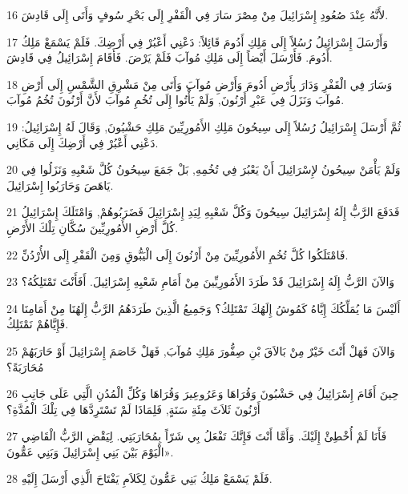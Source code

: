 \par 16 لأَنَّهُ عِنْدَ صُعُودِ إِسْرَائِيلَ مِنْ مِصْرَ سَارَ فِي الْقَفْرِ إِلَى بَحْرِ سُوفٍ وَأَتَى إِلَى قَادِشَ.
\par 17 وَأَرْسَلَ إِسْرَائِيلُ رُسُلاً إِلَى مَلِكِ أَدُومَ قَائِلاً: دَعْنِي أَعْبُرْ فِي أَرْضِكَ. فَلَمْ يَسْمَعْ مَلِكُ أَدُومَ. فَأَرْسَلَ أَيْضاً إِلَى مَلِكِ مُوآبَ فَلَمْ يَرْضَ. فَأَقَامَ إِسْرَائِيلُ فِي قَادِشَ.
\par 18 وَسَارَ فِي الْقَفْرِ وَدَارَ بِأَرْضِ أَدُومَ وَأَرْضِ مُوآبَ وَأَتَى مِنْ مَشْرِقِ الشَّمْسِ إِلَى أَرْضِ مُوآبَ وَنَزَلَ فِي عَبْرِ أَرْنُونَ, وَلَمْ يَأْتُوا إِلَى تُخُمِ مُوآبَ لأَنَّ أَرْنُونَ تُخُمُ مُوآبَ.
\par 19 ثُمَّ أَرْسَلَ إِسْرَائِيلُ رُسُلاً إِلَى سِيحُونَ مَلِكِ الأَمُورِيِّينَ مَلِكِ حَشْبُونَ, وَقَالَ لَهُ إِسْرَائِيلُ: دَعْنِي أَعْبُرْ فِي أَرْضِكَ إِلَى مَكَانِي.
\par 20 وَلَمْ يَأْمَنْ سِيحُونُ لإِسْرَائِيلَ أَنْ يَعْبُرَ فِي تُخُمِهِ, بَلْ جَمَعَ سِيحُونُ كُلَّ شَعْبِهِ وَنَزَلُوا فِي يَاهَصَ وَحَارَبُوا إِسْرَائِيلَ.
\par 21 فَدَفَعَ الرَّبُّ إِلَهُ إِسْرَائِيلَ سِيحُونَ وَكُلَّ شَعْبِهِ لِيَدِ إِسْرَائِيلَ فَضَرَبُوهُمْ, وَامْتَلَكَ إِسْرَائِيلُ كُلَّ أَرْضِ الأَمُورِيِّينَ سُكَّانِ تِلْكَ الأَرْضِ.
\par 22 فَامْتَلَكُوا كُلَّ تُخُمِ الأَمُورِيِّينَ مِنْ أَرْنُونَ إِلَى الْيَبُّوقِ وَمِنَ الْقَفْرِ إِلَى الأُرْدُنِّ.
\par 23 وَالآنَ الرَّبُّ إِلَهُ إِسْرَائِيلَ قَدْ طَرَدَ الأَمُورِيِّينَ مِنْ أَمَامِ شَعْبِهِ إِسْرَائِيلَ. أَفَأَنْتَ تَمْتَلِكُهُ؟
\par 24 أَلَيْسَ مَا يُمَلِّكُكَ إِيَّاهُ كَمُوشُ إِلَهُكَ تَمْتَلِكُ؟ وَجَمِيعُ الَّذِينَ طَرَدَهُمُ الرَّبُّ إِلَهُنَا مِنْ أَمَامِنَا فَإِيَّاهُمْ نَمْتَلِكُ.
\par 25 وَالآنَ فَهَلْ أَنْتَ خَيْرٌ مِنْ بَالاَقَ بْنِ صِفُّورَ مَلِكِ مُوآبَ, فَهَلْ خَاصَمَ إِسْرَائِيلَ أَوْ حَارَبَهُمْ مُحَارَبَةً؟
\par 26 حِينَ أَقَامَ إِسْرَائِيلُ فِي حَشْبُونَ وَقُرَاهَا وَعَرُوعِيرَ وَقُرَاهَا وَكُلِّ الْمُدُنِ الَّتِي عَلَى جَانِبِ أَرْنُونَ ثَلاَثَ مِئَةِ سَنَةٍ, فَلِمَاذَا لَمْ تَسْتَرِدَّهَا فِي تِلْكَ الْمُدَّةِ؟
\par 27 فَأَنَا لَمْ أُخْطِئْ إِلَيْكَ. وَأَمَّا أَنْتَ فَإِنَّكَ تَفْعَلُ بِي شَرّاً بِمُحَارَبَتِي. لِيَقْضِ الرَّبُّ الْقَاضِي الْيَوْمَ بَيْنَ بَنِي إِسْرَائِيلَ وَبَنِي عَمُّونَ».
\par 28 فَلَمْ يَسْمَعْ مَلِكُ بَنِي عَمُّونَ لِكَلاَمِ يَفْتَاحَ الَّذِي أَرْسَلَ إِلَيْهِ.
